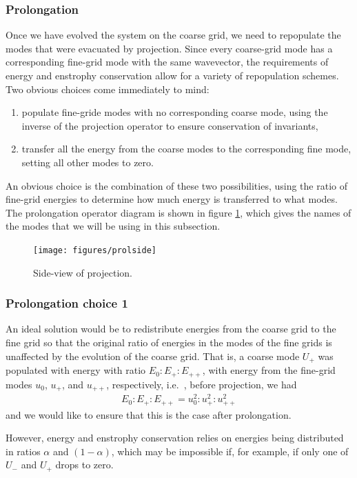 \documentclass[10pt,showpacs,showkeys,%
amsfonts,amsmath,onecolumn,
floatfix,aps,superscriptaddress]{revtex4}
\begin{document}
\subsubsection{Prolongation}
Once we have evolved the system on the coarse grid, we need to
repopulate the modes that were evacuated by projection.  Since every
coarse-grid mode has a corresponding fine-grid mode with the same
wavevector, the requirements of energy and enstrophy conservation
allow for a variety of repopulation schemes.  Two obvious choices come
immediately to mind:
\begin{enumerate}
\item
populate fine-gride modes with no corresponding coarse mode, using the inverse
of the projection operator to ensure conservation of invariants, 
\item
transfer all the energy from the coarse modes to the corresponding fine 
mode, setting all other modes to zero.
\end{enumerate}
An obvious choice is the combination of these two possibilities, using 
the ratio of fine-grid energies to determine how much energy is transferred
to what modes. The prolongation operator diagram is shown in figure 
\ref{prolside}, which gives the names of the modes that we will be using
in this subsection.
\begin{figure}[htb]
  \begin{center}
    \texttt{[image: figures/prolside]}
    \caption{Side-view of projection.}
    \label{prolside}
  \end{center}
\end{figure}

\subsubsection{Prolongation choice 1}
An ideal solution would be to redistribute energies from the coarse grid
to the fine grid so that the original ratio of energies in the modes
of the fine grids is unaffected by the evolution of the coarse grid.
That is, a coarse mode $U_+$ was populated with energy with ratio 
$E_0:E_+:E_{++}$, with energy from the fine-grid modes $u_0$, $u_+$, 
and $u_{++}$, respectively, i.e.\ , before projection, we had
\begin{eqnarray}
  E_0:E_+:E_{++} = u_0^2: u_+^2: u_{++}^2
\end{eqnarray}
and we would like to ensure that this is the case after prolongation. 

However, energy and enstrophy conservation relies on energies being 
distributed in ratios $\alpha$ and $(1-\alpha)$, which may be impossible if,
for example, if only one of $U_-$ and $U_+$ drops to zero.
\end{document}
